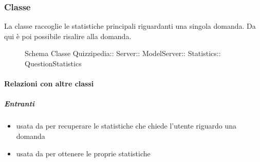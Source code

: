 \subsubsection{Classe }
La classe raccoglie le statistiche principali riguardanti una singola domanda. Da qui è poi possibile risalire alla domanda.
\begin{figure}[H]
\centering
\noindent{}
\caption[Schema Classe QuestionStatistics]{Schema Classe Quizzipedia:: Server:: ModelServer:: Statistics:: QuestionStatistics}
\end{figure}
\paragraph{Relazioni con altre classi}
\subparagraph{Entranti}
\begin{itemize}
\item usata da  per recuperare le statistiche che chiede l'utente riguardo una domanda
\item usata da  per ottenere le proprie statistiche
\end{itemize}
